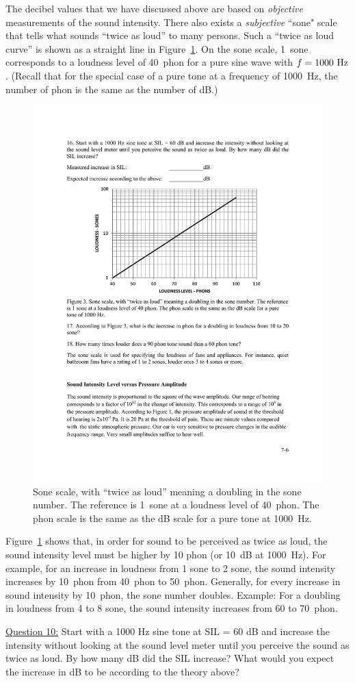 \documentclass[11pt]{NSF}
\begin{document}
The decibel values that we have discussed above are based on 
{\em objective} measurements of the sound intensity. 
There also exists a {\em subjective} ``sone" scale that tells 
what sounds ``twice as loud” to many persons. 
Such a ``twice as loud curve” is shown as a straight line in 
Figure~\ref{f:3}. 
On the sone scale, 1~sone corresponds to a loudness level of 
40~phon for a pure sine wave with $f = 1000~{\rm Hz}$. 
(Recall that for the special case of a pure tone at a frequency 
of 1000~Hz, the number of phon is the same 
as the number of dB.)
%
\begin{figure}[hbtp]
\begin{center}
\includegraphics[width=.6\textwidth]{fig7_3}
\caption{Sone scale, with ``twice as loud” meaning a doubling in the
sone number. The reference is 1~sone at a loudness level of 40~phon.
The phon scale is the same as the dB scale for a pure tone at 1000~Hz.}
\label{f:3}
\end{center}
\end{figure}

Figure~\ref{f:3} shows that, in order for sound to be perceived as twice as
loud, the sound intensity level must be higher by 10 phon (or 10~dB at
1000~Hz).
For example, for an increase in loudness from 1 sone to 2 sone, the 
sound intensity increases by 10~phon from 40~phon to 50~phon. 
Generally, for every increase in sound intensity by 10~phon, the sone 
number doubles. 
Example: For a doubling in loudness from 4 to 8 sone, the sound intensity 
increases from 60 to 70~phon.

\underline{Question 10:} Start with a 1000 Hz sine tone at SIL = 60 dB and increase the intensity without looking at
the sound level meter until you perceive the sound as twice as loud. By how many dB did the
SIL increase? What would you expect the increase in dB to be according to the theory above?
\end{document}
